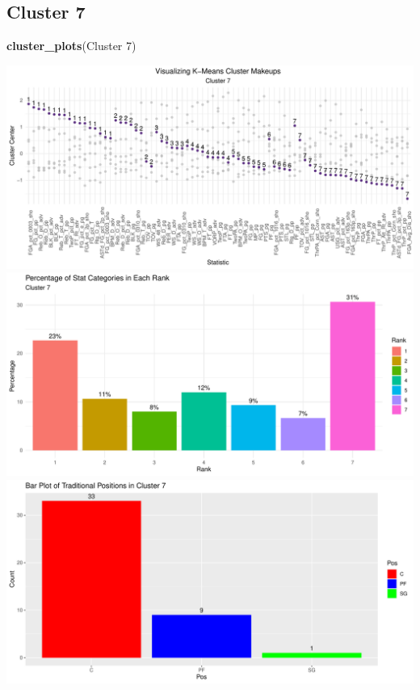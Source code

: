 \documentclass[
]{article}
\newenvironment{Shaded}{\begin{snugshade}}{\end{snugshade}}
\newcommand{\FunctionTok}[1]{\textcolor[rgb]{0.13,0.29,0.53}{\textbf{#1}}}
\newcommand{\NormalTok}[1]{#1}
\newcommand{\StringTok}[1]{\textcolor[rgb]{0.31,0.60,0.02}{#1}}
\begin{document}
\hypertarget{cluster-7}{%
\subsection{Cluster 7}\label{cluster-7}}

\begin{Shaded}
\begin{Highlighting}[]
\FunctionTok{cluster\_plots}\NormalTok{(}\StringTok{\textquotesingle{}Cluster 7\textquotesingle{}}\NormalTok{)}
\end{Highlighting}
\end{Shaded}

\includegraphics{Reclassifying-NBA-Player-Postions-Pt.-3---Clustering-Analysis-Results_files/figure-latex/unnamed-chunk-8-1.pdf}
\includegraphics{Reclassifying-NBA-Player-Postions-Pt.-3---Clustering-Analysis-Results_files/figure-latex/unnamed-chunk-8-2.pdf}
\includegraphics{Reclassifying-NBA-Player-Postions-Pt.-3---Clustering-Analysis-Results_files/figure-latex/unnamed-chunk-8-3.pdf}
\end{document}
